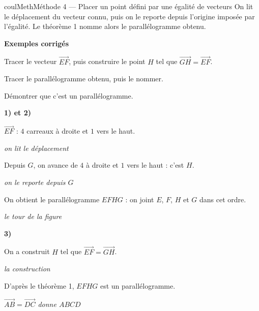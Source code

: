 \documentclass[11pt,a4paper]{article}
\makeatletter
\newcommand{\vect}[1]{\overrightarrow{#1}}
\newcommand{\quadrillage}[4]{\draw[grille,step=1] (#1,#2) grid (#3,#4);}
\newcommand{\pt}[3]{\path (#1) node[croix]{} node[#2,font=\small,inner sep=2.5pt]{$#3$};}
\newcounter{lycee@signet}
\newcommand{\signet}[3][]{\stepcounter{lycee@signet}%
  \edef\lycee@dest{\if\relax\detokenize{#1}\relax
    signet.\arabic{lycee@signet}\else#1\fi}%
  \hypertarget{\lycee@dest}{}\bookmark[level=#2,dest=\lycee@dest]{#3}}
\newcommand{\res}[1]{#1}
\newcounter{methode}
\newenvironment{methodebox}[1][Méthode]{\stepcounter{methode}%
  \begin{boitecours}[phantom={\signet[methode-\arabic{methode}]{2}{#1}}]{coulMeth}{#1}}%
  {\end{boitecours}}
\newcommand{\etape}[1]{\par\smallskip\textbf{\color{coulMeth}#1}\par\nobreak\smallskip}
\newcommand{\explique}[2]{\par\smallskip\noindent
  \begin{minipage}[t]{0.57\linewidth}\raggedright #1\end{minipage}\hfill
  \begin{minipage}[t]{0.40\linewidth}\raggedright\leavevmode
    {\small\itshape\color{black!60}#2}\end{minipage}\par}
\newcommand{\cas}[1]{\par\smallskip\noindent\textbf{\color{coulExo}#1}\vadjust{\nobreak}}
\newenvironment{correction}{\par}{\par}
\newcommand{\etapeexemples}{\etape{Exemples corrigés}}
\makeatother
\begin{document}
\begin{methodebox}[Méthode 4 --- Placer un point défini par une égalité de vecteurs]
On lit le déplacement du vecteur connu, puis on le reporte depuis l'origine imposée par
l'égalité. Le théorème 1 nomme alors le parallélogramme obtenu.
\etapeexemples
\begin{questions}
  \item Tracer le vecteur $\vect{EF}$, puis construire le point $H$ tel que
        $\vect{GH}=\vect{EF}$.
  \item Tracer le parallélogramme obtenu, puis le nommer.
  \item Démontrer que c'est un parallélogramme.
\end{questions}
\begin{center}
\end{center}
\begin{correction}
\cas{1\textdegree) et 2\textdegree)}\par\nopagebreak
\begin{center}
\end{center}
\explique{$\vect{EF}$ : $4$ carreaux à droite et $1$ vers le haut.}{on lit le
déplacement}
\explique{Depuis $G$, on avance de $4$ à droite et $1$ vers le haut : c'est $H$.}{on le
reporte depuis $G$}
\explique{On obtient le parallélogramme \res{$EFHG$} : on joint $E$, $F$, $H$ et $G$ dans cet
ordre.}{le tour de la figure}
\cas{3\textdegree)}\par\nopagebreak
\explique{On a construit $H$ tel que $\vect{EF}=\vect{GH}$.}{la construction}
\explique{D'après le théorème 1, \res{$EFHG$ est un parallélogramme}.}{$\vect{AB}=\vect{DC}$
donne $ABCD$}
\end{correction}


\end{methodebox}
\end{document}
